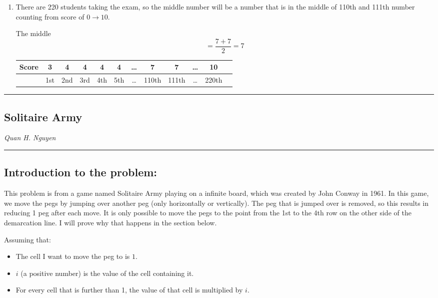 \documentclass[12pt]{article}
\begin{document}
\begin{enumerate}
    \item There are 220 students taking the exam, so the middle number will be a number that is in the middle of 110th and 111th number counting from score of $0 \to 10$. \par
    The middle $$=\frac{7+7}{2}= 7 $$
        
    \begin{center}
        \begin{tabular}{l | c|c|c|c|c|c|c|c|c|c |r}
            Score & 3 & 4 & 4 & 4 & 4 & \dots & 7 & 7 & \dots & 10 \\
            \hline
            &1st &2nd &3rd &4th &5th &\dots &110th &111th &\dots & 220th \\
        \end{tabular}
    \end{center}
        
\end{enumerate}



\newpage

\hrule
\vspace{.2mm}
\begin{center}
    \section*{Solitaire Army}
    \textit{Quan H. Nguyen}
\end{center}
\vspace{.2mm}
\hrule

\subsection*{Introduction to the problem:}

\noindent This problem is from a game named Solitaire Army  playing on a infinite board, which was created by John Conway in 1961. In this game, we move the pegs by jumping over another peg (only horizontally or vertically). The peg that is jumped over is removed, so this results in reducing 1 peg after each move. It is only possible to move the pegs to the point from the 1st to the 4th row on the other side of the demarcation line. I will prove why that happens in the section below.

\noindent Assuming that:
\begin{itemize}
    \item The cell I want to move the peg to is $1$.
    \item $i$ (a positive number) is the value of the cell containing it.
    \item For every cell that is further than 1, the value of that cell is multiplied by $i$.
\end{itemize}
\end{document}
